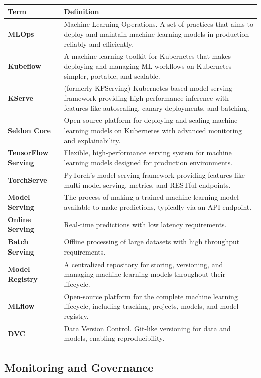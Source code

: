 \documentclass[11pt]{article}
\begin{document}
\begin{longtable}{|p{}|p{}|}
\hline
\textbf{Term} & \textbf{Definition} \\
\hline
\endhead
\textbf{MLOps} & Machine Learning Operations. A set of practices that aims to deploy and maintain machine learning models in production reliably and efficiently. \\
\hline
\textbf{Kubeflow} & A machine learning toolkit for Kubernetes that makes deploying and managing ML workflows on Kubernetes simpler, portable, and scalable. \\
\hline
\textbf{KServe} & (formerly KFServing) Kubernetes-based model serving framework providing high-performance inference with features like autoscaling, canary deployments, and batching. \\
\hline
\textbf{Seldon Core} & Open-source platform for deploying and scaling machine learning models on Kubernetes with advanced monitoring and explainability. \\
\hline
\textbf{TensorFlow Serving} & Flexible, high-performance serving system for machine learning models designed for production environments. \\
\hline
\textbf{TorchServe} & PyTorch's model serving framework providing features like multi-model serving, metrics, and RESTful endpoints. \\
\hline
\textbf{Model Serving} & The process of making a trained machine learning model available to make predictions, typically via an API endpoint. \\
\hline
\textbf{Online Serving} & Real-time predictions with low latency requirements. \\
\hline
\textbf{Batch Serving} & Offline processing of large datasets with high throughput requirements. \\
\hline
\textbf{Model Registry} & A centralized repository for storing, versioning, and managing machine learning models throughout their lifecycle. \\
\hline
\textbf{MLflow} & Open-source platform for the complete machine learning lifecycle, including tracking, projects, models, and model registry. \\
\hline
\textbf{DVC} & Data Version Control. Git-like versioning for data and models, enabling reproducibility. \\
\hline
\end{longtable}

\subsection{Monitoring and Governance}
\end{document}
